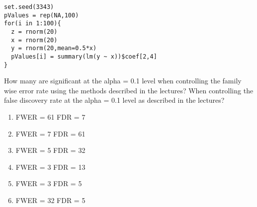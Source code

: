 \documentclass[12pt]{article}
\begin{document}
\begin{framed} 
\begin{verbatim}
set.seed(3343)
pValues = rep(NA,100)
for(i in 1:100){
  z = rnorm(20)
  x = rnorm(20)
  y = rnorm(20,mean=0.5*x)
  pValues[i] = summary(lm(y ~ x))$coef[2,4]
}
\end{verbatim}
\end{framed}

How many are significant at the alpha = 0.1 level when controlling the family
wise error rate using the methods described in the lectures? 
When controlling the false discovery rate at the alpha = 0.1 level as described in the lectures?
\begin{enumerate}
\item FWER = 61 FDR = 7
\item FWER = 7 FDR = 61 
\item FWER = 5 FDR = 32  
\item FWER = 3 FDR = 13 
\item FWER = 3 FDR = 5  
\item FWER = 32 FDR = 5
\end{enumerate}
\end{document}
